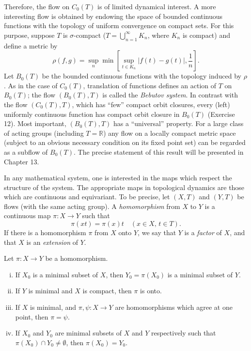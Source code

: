 Therefore, the flow on $C_0(T)$ is of limited dynamical interest. A more interesting flow is obtained by endowing the space of bounded continuous functions with the topology of uniform convergence on compact sets. For this purpose, suppose $T$ is $\sigma$-compact ($T = \bigcup_{n=1}^{\infty} K_n$, where $K_n$ is compact) and define a metric by
\[
    \rho(f, g) = \sup_n \min \left[ \sup_{t \in K_n} |f(t) - g(t)|, \frac{1}{n} \right].
\]
Let $B_0(T)$ be the bounded continuous functions with the topology induced by $\rho$. As in the case of $C_0(T)$, translation of functions defines an action of $T$ on $B_0(T)$; the flow $(B_0(T), T)$ is called the \textit{Bebutov system}. In contrast with the flow $(C_0(T), T)$, which has “few” compact orbit closures, every (left) uniformly continuous function has compact orbit closure in $B_0(T)$ (Exercise 12). Most important, $(B_0(T), T)$ has a “universal” property. For a large class of acting groups (including $T = \mathbb{R}$) any flow on a locally compact metric space (subject to an obvious necessary condition on its fixed point set) can be regarded as a subflow of $B_0(T)$. The precise statement of this result will be presented in Chapter 13.

In any mathematical system, one is interested in the maps which respect the structure of the system. The appropriate maps in topological dynamics are those which are continuous and equivariant. To be precise, let $(X, T)$ and $(Y, T)$ be flows (with the same acting group). A \textit{homomorphism} from $X$ to $Y$ is a continuous map $\pi : X \to Y$ such that
\[
    \pi(xt) = \pi(x)t \quad (x \in X, \, t \in T).
\]
If there is a homomorphism $\pi$ from $X$ onto $Y$, we say that $Y$ is a \textit{factor} of $X$, and that $X$ is an \textit{extension} of $Y$.

\begin{proposition}[14]
    Let $\pi : X \to Y$ be a homomorphism.
    \begin{enumerate}[(i)]
        \item If $X_0$ is a minimal subset of $X$, then $Y_0 = \pi(X_0)$ is a minimal subset of $Y$.
        \item If $Y$ is minimal and $X$ is compact, then $\pi$ is onto.
        \item If $X$ is minimal, and $\pi, \psi : X \to Y$ are homomorphisms which agree at one point, then $\pi = \psi$.
        \item If $X_0$ and $Y_0$ are minimal subsets of $X$ and $Y$ respectively such that $\pi(X_0) \cap Y_0 \ne \emptyset$, then $\pi(X_0) = Y_0$.
    \end{enumerate}
\end{proposition}

